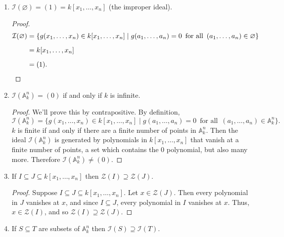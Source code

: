 \documentclass[11pt,oneside,english]{amsart}
\theoremstyle{definition}
\newcommand{\MC}[1]{\mathcal{#1}}
\newcommand{\MB}[1]{\mathbb{#1}}
\begin{document}
\begin{enumerate}[leftmargin=*]
\begin{enumerate}
\begin{proof}
The zero set of the constant polynomial 1, i.e. $\MC{Z}(1)$, is the set of all points in $\MB{A}_k^n$ that vanish under the polynomial 1, which is none of them since it sends all points to 1, so $\MC{Z}(1) = \varnothing$. In general, $\MC{Z}(c)=\varnothing$ for any \textit{nonzero} constant $c$.
\end{proof}

\item $\MC{I}(\varnothing)  = (1)= k[x_1, \dots, x_n]$ (the improper ideal).

\begin{proof}
\begin{align*}
\MC{I}(\varnothing)&=\{g(x_1,\ldots,x_n)\in k[x_1,\ldots,x_n]\mid g(a_1,\ldots,a_n)=0\,\text{ for all }\, (a_1,\ldots,a_n)\in\varnothing\}\\[2mm]
&=k[x_1,\ldots,x_n]\\[2mm]
&=(1).\qedhere
\end{align*}
\end{proof}

\item $\MC{I}(\MB{A}^n_k) = (0)$ if and only if $k$ is infinite.

\begin{proof}
We'll prove this by contrapositive. By definition,
\[
\MC{I}(\MB{A}^n_k)=\{g(x_1,\ldots,x_n)\in k[x_1,\ldots,x_n]\mid g(a_1,\ldots,a_n)=0\,\text{ for all }\, (a_1,\ldots,a_n)\in\MB{A}^n_k\}.
\]
$k$ is finite if and only if there are a finite number of points in $\MB{A}_k^n$. Then the ideal $\MC{I}(\MB{A}^n_k)$ is generated by polynomials in $k[x_1,\ldots,x_n]$ that vanish at a finite number of points, a set which contains the 0 polynomial, but also many more. Therefore $\MC{I}(\MB{A}^n_k)\neq(0)$.
\end{proof}

\item If $I \subseteq J\subseteq k[x_1,\ldots, x_n]$ then $\MC{Z}(I) \supseteq \MC{Z}(J)$.

\begin{proof}
Suppose $I \subseteq J\subseteq k[x_1,\ldots, x_n]$. Let $x\in \MC{Z}(J)$. Then every polynomial in $J$ vanishes at $x$, and since $I\subseteq J$, every polynomial in $I$ vanishes at $x$. Thus, $x\in \MC{Z}(I)$, and so $\MC{Z}(I) \supseteq \MC{Z}(J)$.
\end{proof}

\item If $S \subseteq T$ are subsets of $\MB{A}_k^n$ then $\MC{I}(S) \supseteq \MC{I}(T)$.


\end{enumerate}
\end{enumerate}
\end{document}
